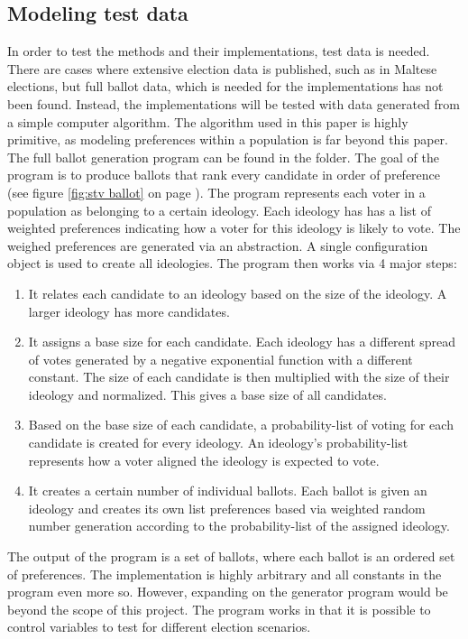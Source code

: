\documentclass[12pt]{article}
\begin{document}
\subsection{Modeling test data}
In order to test the methods and their implementations, test data is needed. There are cases where extensive election data is published, such as in Maltese elections, but full ballot data, which is needed for the implementations has not been found. Instead, the implementations will be tested with data generated from a simple computer algorithm. The algorithm used in this paper is highly primitive, as modeling preferences within a population is far beyond this paper. The full ballot generation program can be found in the  folder. The goal of the program is to produce ballots that rank every candidate in order of preference (see figure \ref{fig:stv ballot} on page \pageref{fig:stv ballot}). The program represents each voter in a population as belonging to a certain ideology. Each ideology has has a list of weighted preferences indicating how a voter for this ideology is likely to vote. The weighed preferences are generated via an abstraction. A single configuration object is used to create all ideologies.
The program then works via 4 major steps:
\begin{enumerate}
	\item It relates each candidate to an ideology based on the size of the ideology. A larger ideology has more candidates.
	\item It assigns a base size for each candidate. Each ideology has a different spread of votes generated by a negative exponential function with a different constant. The size of each candidate is then multiplied with the size of their ideology and normalized. This gives a base size of all candidates.
	\item Based on the base size of each candidate, a probability-list of voting for each candidate is created for every ideology. An ideology's probability-list represents how a voter aligned the ideology is expected to vote.
	\item It creates a certain number of individual ballots. Each ballot is given an ideology and creates its own list preferences based via weighted random number generation according to the probability-list of the assigned ideology.
\end{enumerate}
The output of the program is a set of ballots, where each ballot is an ordered set of preferences. The implementation is highly arbitrary and all constants in the program even more so. However, expanding on the generator program would be beyond the scope of this project. The program works in that it is possible to control variables to test for different election scenarios.
\end{document}
